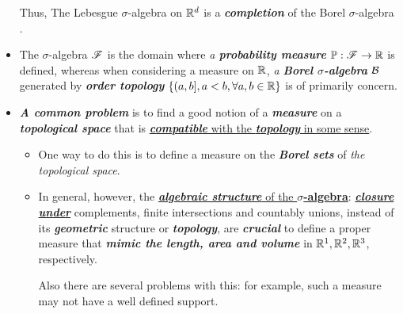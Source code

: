 \documentclass[11pt]{article}
\begin{document}
\begin{itemize}
\begin{remark}
Thus, The Lebesgue $\sigma$-algebra on ${\mathbb R}^d$ is a \emph{\textbf{completion}} of the Borel $\sigma$-algebra  \citep{tao2011introduction}.
\end{remark}

\item \begin{example}
The $\sigma$-algebra ${\mathscr F}$ is the domain where \emph{a \textbf{probability measure}} ${\mathbb P}: {\mathscr F} \rightarrow {\mathbb R}$ is defined, whereas when considering a measure on ${\mathbb R}$, \emph{a \textbf{Borel $\sigma$-algebra} ${\mathcal B}$} generated by \emph{\textbf{order topology}} $\{ (a,b], a< b,\forall a,b\in {\mathbb R}\}$ is of primarily concern.
\end{example}

\item \begin{remark} \emph{\textbf{A common problem}} is to find a good notion of a \emph{\textbf{measure}} on a \emph{\textbf{topological space}} that is \underline{\emph{\textbf{compatible}} with the \emph{\textbf{topology}} in some sense}. 
\begin{itemize}
\item One way to do this is to define a measure on the \emph{\textbf{Borel sets}} of \emph{the topological space}.  
\item In general, however, the \underline{\emph{\textbf{algebraic structure}} of the \textbf{$\sigma$-algebra}}: \underline{\emph{\textbf{closure under}}} complements, finite intersections and countably unions, instead of its \emph{\textbf{geometric}} structure or \emph{\textbf{topology}}, are \emph{\textbf{crucial}} to define a proper measure that \emph{\textbf{mimic the length, area and volume}} in ${\mathbb R}^{1}, {\mathbb R}^{2}, {\mathbb R}^{3}$, respectively. 

Also there are several problems with this: for example, such a measure may not have a well defined support. 
\end{itemize}
\end{remark}
\end{itemize}
\newpage
\end{document}
